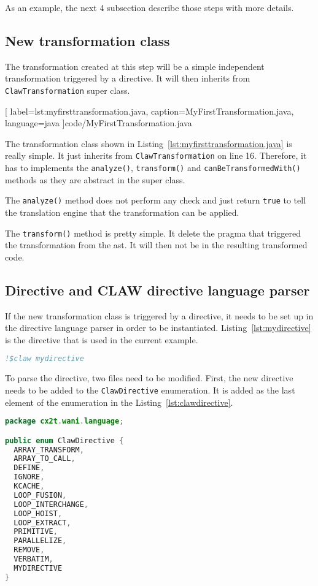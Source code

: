 As an example, the next 4 subsection describe those steps with more details.

\subsection{New transformation class}
The transformation created at this step will be a simple independent
transformation triggered by a directive. It will then inherits from
\lstinline|ClawTransformation| super class.


  [
    label=lst:myfirsttransformation.java,
    caption=MyFirstTransformation.java,
    language=java
  ]{code/MyFirstTransformation.java}

The transformation class shown in Listing~\ref{lst:myfirsttransformation.java}
is really simple. It just inherits from \lstinline|ClawTransformation| on line
16. Therefore, it has to implements the \lstinline|analyze()|,
\lstinline|transform()| and \lstinline|canBeTransformedWith()| methods as they
are abstract in the super class.

The \lstinline|analyze()| method does not perform any check and just return
\lstinline|true| to tell the translation engine that the transformation can
be applied.

The \lstinline|transform()| method is pretty simple. It delete the pragma that
triggered the transformation from the \gls{ast}. It will then not be in the
resulting transformed code.

\subsection{Directive and CLAW directive language parser}
If the new transformation class is triggered by a directive, it needs to
be set up in the directive language parser in order to be instantiated.
Listing~\ref{lst:mydirective} is the directive that is used in
the current example.

\begin{lstlisting}[label=lst:mydirective, caption=Example directive,
  language=fortran]
!$claw mydirective
\end{lstlisting}

To parse the directive, two files need to be modified. First, the new directive
needs to be added to the \lstinline|ClawDirective| enumeration. It is added as
the last element of the enumeration in the Listing~\ref{lst:clawdirective}.

\begin{lstlisting}[label=lst:clawdirective, caption=ClawDirective.java,
  language=java]
package cx2t.wani.language;

public enum ClawDirective {
  ARRAY_TRANSFORM,
  ARRAY_TO_CALL,
  DEFINE,
  IGNORE,
  KCACHE,
  LOOP_FUSION,
  LOOP_INTERCHANGE,
  LOOP_HOIST,
  LOOP_EXTRACT,
  PRIMITIVE,
  PARALLELIZE,
  REMOVE,
  VERBATIM,
  MYDIRECTIVE
}
\end{lstlisting}

